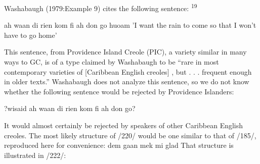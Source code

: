 Washabaugh (1979:Example 9) cites the following sentence: \textsuperscript{19}

\ea\label{ex:220}
 ah waan di rien kom fi ah don go huoam
\glt 'I want the rain to come so that I won't have to go home'
\z



This sentence, from Providence Island Creole (PIC), a variety similar in many ways to GC, is of a type claimed by Washabaugh to be ``rare in most contemporary varieties of [Caribbean English creoles] , but . . . frequent enough in older texts.'' Washabaugh does not analyze this sentence, so we do not know whether the following sentence would be rejected by Providence Islanders:

\ea\label{ex:221}
 ?wisaid ah waan di rien kom fi ah don go?
\z

It would almost certainly be rejected by speakers of other Caribbean English creoles.
The most likely structure of /220/ would be one similar to that
of /185/, reproduced here for convenience: dem gaan mek mi glad
That structure is illustrated in /222/:



\ea\label{ex:222}
\z

